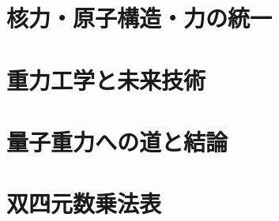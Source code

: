 \documentclass[dvipdfmx,a4paper]{jsbook}
\theoremstyle{definition}
\theoremstyle{remark}
\begin{document}
\chapter{核力・原子構造・力の統一}

\chapter{重力工学と未来技術}

\chapter{量子重力への道と結論}

\backmatter

\appendix

\renewcommand{\arraystretch}{1.5}

\chapter{双四元数乗法表}
\end{document}
